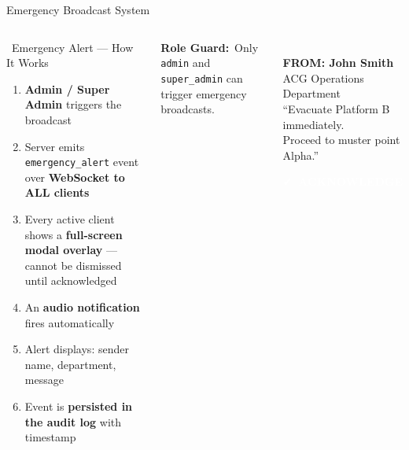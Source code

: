 \documentclass[aspectratio=169,12pt]{beamer}
\begin{document}
\begin{frame}{Emergency Broadcast System}
\begin{columns}[t]
\begin{alertblock}{\faBell\ Emergency Alert --- How It Works}
\small
\begin{enumerate}\setlength\itemsep{5pt}
  \item \textbf{Admin / Super Admin} triggers the broadcast
  \item Server emits \texttt{emergency\_alert} event over \textbf{WebSocket to ALL clients}
  \item Every active client shows a \textbf{full-screen modal overlay} --- cannot be dismissed until acknowledged
  \item An \textbf{audio notification} fires automatically
  \item Alert displays: sender name, department, message
  \item Event is \textbf{persisted in the audit log} with timestamp
\end{enumerate}
\end{alertblock}

\vspace{4pt}
\begin{tcolorbox}[colback=AccentRed!8,colframe=AccentRed,arc=4pt,
  left=4pt,right=4pt,top=3pt,bottom=3pt]
\scriptsize\centering\textbf{Role Guard:}\ Only \texttt{admin} and \texttt{super\_admin} can trigger emergency broadcasts.
\end{tcolorbox}

\vspace{4pt}
\begin{tcolorbox}[colback=AccentRed!5,colframe=AccentRed,arc=8pt,
  title={\faExclamationTriangle\ Emergency Alert},
  fonttitle=\bfseries\color{white}\normalsize,
  attach boxed title to top center={yshift=-2mm},
  boxed title style={colback=AccentRed,arc=4pt},
  left=8pt,right=8pt,top=12pt,bottom=12pt,
  halign=center]
\centering
{\Large\textcolor{AccentRed}{\faBell}}\\[6pt]
{\small\textbf{FROM: John Smith}}\\
{\scriptsize\textcolor{TextMid}{ACG Operations Department}}\\[8pt]
{\small ``Evacuate Platform B immediately.\\Proceed to muster point Alpha.''}\\[10pt]
\begin{tcolorbox}[colback=AccentRed,colframe=AccentRed,arc=3pt,
  left=2pt,right=2pt,top=2pt,bottom=2pt,halign=center]
\scriptsize\textbf{\textcolor{white}{\faCheck\ ACKNOWLEDGE}}
\end{tcolorbox}
\end{tcolorbox}
\end{columns}
\end{frame}
\end{document}
